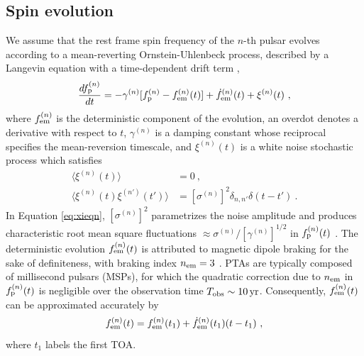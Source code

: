 \documentclass[fleqn,usenatbib,useAMS]{mnras}
\begin{document}
\subsection{Spin evolution} \label{sec:psr_frequency}
We assume that the rest frame spin frequency of the $n$-th pulsar evolves according to a mean-reverting Ornstein-Uhlenbeck process, described by a Langevin equation with a time-dependent drift term \citep{Vargas},
\begin{equation}
	\frac{df_{\rm p}^{(n)}}{dt} = -\gamma^{(n)}	 [f_{\rm p}^{(n)} - f_{\rm em}^{(n)} (t)] + \dot{f}_{\rm em}^{(n)}(t) +\xi^{(n)}(t) \ , 
	\label{eq:frequency_evolution}
\end{equation}
where $f_{\rm em}^{(n)}$ is the deterministic component of the evolution, an overdot denotes a derivative with respect to $t$, $\gamma^{(n)}$ is a damping constant whose reciprocal specifies the mean-reversion timescale, and $\xi^{(n)}(t)$ is a white noise stochastic process which satisfies
\begin{align}
	\langle \xi^{(n)}(t) \rangle &= 0 \ , \\
	\langle \xi^{(n)}(t) \xi^{(n')}(t') \rangle &= [\sigma^{(n)}]^2 \delta_{n,n'} \delta(t - t') \ .	\label{eq:xieqn}
\end{align}
In Equation \eqref{eq:xieqn}, $[\sigma^{(n)}]^2$ parametrizes the noise amplitude and produces characteristic root mean square fluctuations $\approx \sigma^{(n)} / [\gamma^{(n)}]^{1/2}$ in $f_{\rm p}^{(n)}(t)$ \citep{gardiner2009stochastic}. The deterministic evolution $f_{\rm em}^{(n)}(t)$ is attributed to magnetic dipole braking for the sake of definiteness, with braking index $n_{\rm em}=3$ \citep{1969ApJ...157..869G}. PTAs are typically composed of millisecond pulsars (MSPs), for which the quadratic correction due to $n_{\rm em}$ in $f_{\rm p}^{(n)}(t)$ is negligible over the observation time $T_{\rm obs} \sim 10 \, {\rm yr}$. Consequently, 	$f_{\rm em}^{(n)}(t)$ can be approximated accurately by 
\begin{equation}
	f_{\rm em}^{(n)}(t) = f_{\rm em}^{(n)}(t_1) + \dot{f}_{\rm em}^{(n)}(t_1) (t - t_1) \ , \label{eq:spinevol}
\end{equation} 
where $t_1$ labels the first TOA. \newline 
\end{document}
